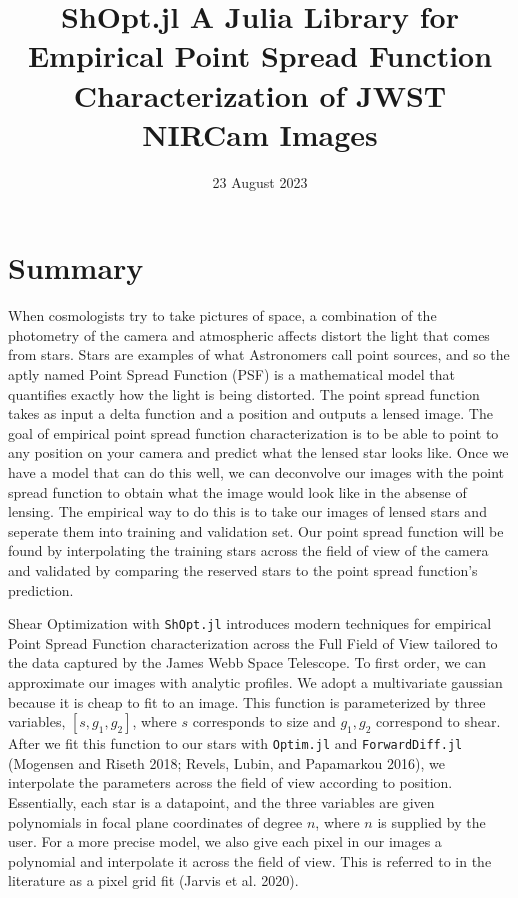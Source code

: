\documentclass[
]{article}
\title{ShOpt.jl \textbar{} A Julia Library for Empirical Point Spread
Function Characterization of JWST NIRCam Images}
\author{}
\date{23 August 2023}
\begin{document}
\maketitle

\hypertarget{summary}{%
\section{Summary}\label{summary}}

When cosmologists try to take pictures of space, a combination of the
photometry of the camera and atmospheric affects distort the light that
comes from stars. Stars are examples of what Astronomers call point
sources, and so the aptly named Point Spread Function (PSF) is a
mathematical model that quantifies exactly how the light is being
distorted. The point spread function takes as input a delta function and
a position and outputs a lensed image. The goal of empirical point
spread function characterization is to be able to point to any position
on your camera and predict what the lensed star looks like. Once we have
a model that can do this well, we can deconvolve our images with the
point spread function to obtain what the image would look like in the
absense of lensing. The empirical way to do this is to take our images
of lensed stars and seperate them into training and validation set. Our
point spread function will be found by interpolating the training stars
across the field of view of the camera and validated by comparing the
reserved stars to the point spread function's prediction.

Shear Optimization with \texttt{ShOpt.jl} introduces modern techniques
for empirical Point Spread Function characterization across the Full
Field of View tailored to the data captured by the James Webb Space
Telescope. To first order, we can approximate our images with analytic
profiles. We adopt a multivariate gaussian because it is cheap to fit to
an image. This function is parameterized by three variables,
\([s, g_1, g_2]\), where \(s\) corresponds to size and \(g_1 , g_2\)
correspond to shear. After we fit this function to our stars with
\texttt{Optim.jl} and \texttt{ForwardDiff.jl} (Mogensen and Riseth 2018;
Revels, Lubin, and Papamarkou 2016), we interpolate the parameters
across the field of view according to position. Essentially, each star
is a datapoint, and the three variables are given polynomials in focal
plane coordinates of degree \(n\), where \(n\) is supplied by the user.
For a more precise model, we also give each pixel in our images a
polynomial and interpolate it across the field of view. This is referred
to in the literature as a pixel grid fit (Jarvis et al. 2020).
\end{document}
